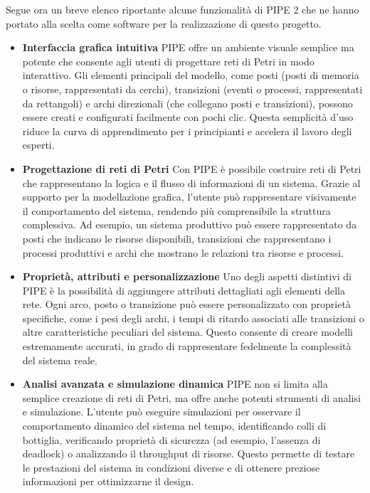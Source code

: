 \newpage
Segue ora un breve elenco riportante alcune funzionalità di PIPE 2 che ne hanno portato alla scelta come software per la realizzazione di questo progetto.

\begin{itemize}
    \item \textbf{Interfaccia grafica intuitiva}
    PIPE offre un ambiente visuale semplice ma potente che consente agli utenti di progettare reti di Petri in modo interattivo. Gli elementi principali del modello, come posti (posti di memoria o risorse, rappresentati da cerchi), transizioni (eventi o processi, rappresentati da rettangoli) e archi direzionali (che collegano posti e transizioni), possono essere creati e configurati facilmente con pochi clic. Questa semplicità d'uso riduce la curva di apprendimento per i principianti e accelera il lavoro degli esperti.
    
    \item \textbf{Progettazione di reti di Petri}
    Con PIPE è possibile costruire reti di Petri che rappresentano la logica e il flusso di informazioni di un sistema. Grazie al supporto per la modellazione grafica, l'utente può rappresentare visivamente il comportamento del sistema, rendendo più comprensibile la struttura complessiva. Ad esempio, un sistema produttivo può essere rappresentato da posti che indicano le risorse disponibili, transizioni che rappresentano i processi produttivi e archi che mostrano le relazioni tra risorse e processi.
    
    \item \textbf{Proprietà, attributi e personalizzazione}
    Uno degli aspetti distintivi di PIPE è la possibilità di aggiungere attributi dettagliati agli elementi della rete. Ogni arco, posto o transizione può essere personalizzato con proprietà specifiche, come i pesi degli archi, i tempi di ritardo associati alle transizioni o altre caratteristiche peculiari del sistema. Questo consente di creare modelli estremamente accurati, in grado di rappresentare fedelmente la complessità del sistema reale.
    
    \item \textbf{Analisi avanzata e simulazione dinamica}
    PIPE non si limita alla semplice creazione di reti di Petri, ma offre anche potenti strumenti di analisi e simulazione. L'utente può eseguire simulazioni per osservare il comportamento dinamico del sistema nel tempo, identificando colli di bottiglia, verificando proprietà di sicurezza (ad esempio, l'assenza di deadlock) o analizzando il throughput di risorse. Questo permette di testare le prestazioni del sistema in condizioni diverse e di ottenere preziose informazioni per ottimizzarne il design.
\end{itemize}